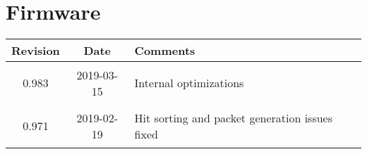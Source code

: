 \section{Firmware}
\begin{tabularx}{\textwidth}{|c|c|X|}
    \hline
    Revision & Date & Comments\\
    \hline\hline
    \hypertarget{fwrev}{0.983} & 2019-03-15 & Internal optimizations\\
    \hline
    \hypertarget{fwrev}{0.971} & 2019-02-19 & Hit sorting and packet generation issues fixed\\
    \hline
\end{tabularx}